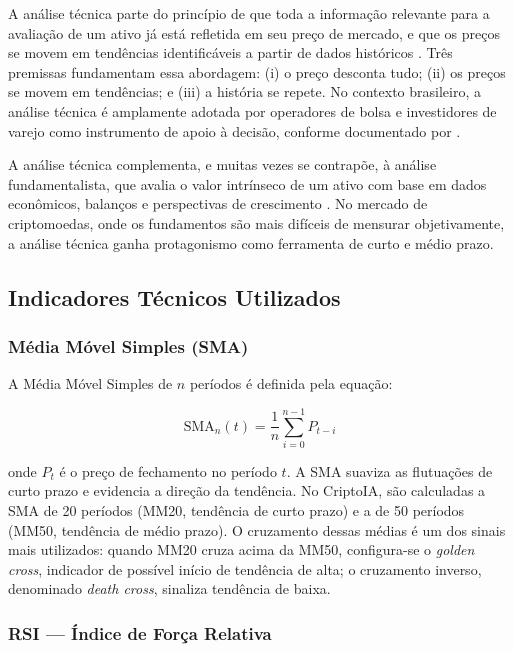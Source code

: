 \documentclass[conference]{IEEEtran}
\begin{document}
A análise técnica parte do princípio de que toda a informação relevante para a avaliação de um ativo já está refletida em seu preço de mercado, e que os preços se movem em tendências identificáveis a partir de dados históricos \cite{edwards2018technical}. Três premissas fundamentam essa abordagem: (i) o preço desconta tudo; (ii) os preços se movem em tendências; e (iii) a história se repete. No contexto brasileiro, a análise técnica é amplamente adotada por operadores de bolsa e investidores de varejo como instrumento de apoio à decisão, conforme documentado por \cite{cavalcante2005mercado}.

A análise técnica complementa, e muitas vezes se contrapõe, à análise fundamentalista, que avalia o valor intrínseco de um ativo com base em dados econômicos, balanços e perspectivas de crescimento \cite{assaf2012mercado}. No mercado de criptomoedas, onde os fundamentos são mais difíceis de mensurar objetivamente, a análise técnica ganha protagonismo como ferramenta de curto e médio prazo.

\subsection{Indicadores Técnicos Utilizados}

\subsubsection{Média Móvel Simples (SMA)}

A Média Móvel Simples de $n$ períodos é definida pela equação:

\begin{equation}
  \text{SMA}_n(t) = \frac{1}{n} \sum_{i=0}^{n-1} P_{t-i}
  \label{eq:sma}
\end{equation}

\noindent onde $P_t$ é o preço de fechamento no período $t$. A SMA suaviza as flutuações de curto prazo e evidencia a direção da tendência. No CriptoIA, são calculadas a SMA de 20 períodos (MM20, tendência de curto prazo) e a de 50 períodos (MM50, tendência de médio prazo). O cruzamento dessas médias é um dos sinais mais utilizados: quando MM20 cruza acima da MM50, configura-se o \textit{golden cross}, indicador de possível início de tendência de alta; o cruzamento inverso, denominado \textit{death cross}, sinaliza tendência de baixa.

\subsubsection{RSI — Índice de Força Relativa}
\end{document}
